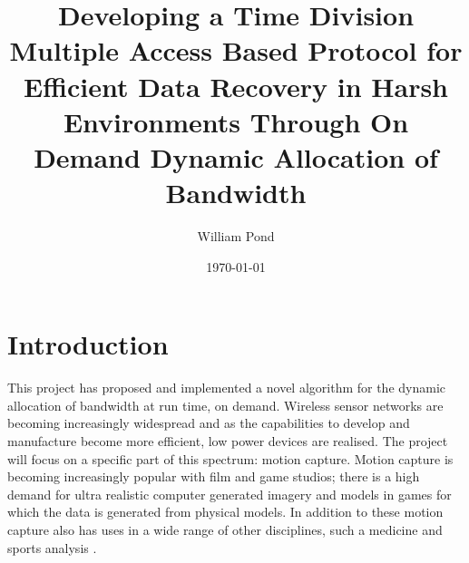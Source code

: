 \documentclass[parskip]{cs4rep}
\begin{document}
\title{Developing a Time Division Multiple Access Based Protocol for Efficient Data Recovery in Harsh Environments Through On Demand Dynamic Allocation of Bandwidth}

\author{William Pond}




\date{\today}



\maketitle

\tableofcontents


\chapter{Introduction}

This project has proposed and implemented a novel algorithm for the dynamic allocation of bandwidth at run time, on demand. Wireless sensor networks are becoming increasingly widespread and as the capabilities to develop and manufacture become more efficient, low power devices are realised. The project will focus on a specific part of this spectrum: motion capture. Motion capture is becoming increasingly popular with film and game studios; there is a high demand for ultra realistic computer generated imagery and models in games for which the data is generated from physical models. In addition to these motion capture also has uses in a wide range of other disciplines, such a medicine \cite{SPECK1} and sports analysis \cite{SPECK2}.
\end{document}
